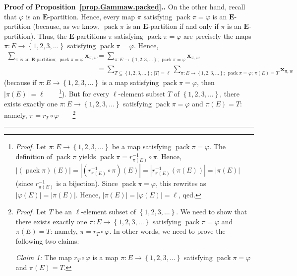 \documentclass[numbers=enddot,12pt,final,onecolumn,notitlepage,abstracton]{scrartcl}
\theoremstyle{definition}
\newenvironment{proof}[1][Proof]{\noindent\textbf{#1.} }{\ \rule{0.5em}{0.5em}}
\let\sumnonlimits\sum
\renewcommand{\sum}{\sumnonlimits\limits}
\newcommand{\xx}{{\mathbf{x}}}
\newcommand{\pack}{\operatorname{pack}}
\newcommand{\EE}{{\mathbf{E}}}
\begin{document}
\begin{proof}[Proof of Proposition~\ref{prop.Gammaw.packed}.]
On the other hand, recall that $\varphi$ is an $\EE$-partition.
Hence, every map $\pi$ satisfying $\pack \pi = \varphi$
is an $\EE$-partition (because, as we know, $\pack \pi$ is an
$\EE$-partition if and only if $\pi$ is an $\EE$-partition).
Thus, the $\EE$-partitions $\pi$ satisfying
$\pack \pi = \varphi$ are precisely the maps
$\pi : E \to \left\{1, 2, 3, \ldots\right\}$ satisfying
$\pack \pi = \varphi$. Hence,
\begin{align*}
\sum_{\pi\text{ is an }\EE\text{-partition; } \pack \pi = \varphi}
\xx_{\pi, w}
&= \sum_{\pi : E \to \left\{1, 2, 3, \ldots\right\} \text{; } \pack \pi = \varphi}
\xx_{\pi, w} \\
&= \sum_{T \subseteq \left\{1, 2, 3, \ldots\right\} ; \ \left|T\right| = \ell}
\sum_{\pi : E \to \left\{1, 2, 3, \ldots\right\} \text{; } \pack \pi = \varphi
\text{; } \pi\left(E\right) = T}
\xx_{\pi, w}
\end{align*}
(because if $\pi : E \to \left\{1, 2, 3, \ldots\right\}$ is a map
satisfying $\pack \pi = \varphi$, then
$\left|\pi\left(E\right)\right| = \ell$\ \ \ \ \footnote{\textit{Proof.}
Let $\pi : E \to \left\{1, 2, 3, \ldots\right\}$ be a map
satisfying $\pack \pi = \varphi$. The definition of $\pack \pi$
yields $\pack \pi = r_{\pi\left(E\right)}^{-1} \circ \pi$. Hence,
$\left|\left(\pack \pi\right)\left(E\right)\right|
= \left|\left(r_{\pi\left(E\right)}^{-1} \circ \pi\right)\left(E\right)\right|
= \left|r_{\pi\left(E\right)}^{-1} \left(\pi\left(E\right)\right)\right|
= \left|\pi\left(E\right)\right|$
(since $r_{\pi\left(E\right)}^{-1}$ is a bijection). Since
$\pack \pi = \varphi$, this rewrites as
$\left|\varphi\left(E\right)\right| = \left|\pi\left(E\right)\right|$.
Hence, $ \left|\pi\left(E\right)\right|
= \left|\varphi\left(E\right)\right| = \ell$, qed.}). But for every
$\ell$-element subset $T$ of
$\left\{1, 2, 3, \ldots\right\}$, there exists exactly
one $\pi : E \to \left\{1, 2, 3, \ldots\right\}$ satisfying
$\pack \pi = \varphi$ and $\pi\left(E\right) = T$: namely,
$\pi = r_T \circ \varphi$\ \ \ \ \footnote{\textit{Proof.}
Let $T$ be an $\ell$-element subset of $\left\{
1,2,3,\ldots\right\}  $. We need to show that there exists exactly one
$\pi:E\rightarrow\left\{  1,2,3,\ldots\right\}  $ satisfying
$ \pack \pi=\varphi$ and $\pi\left(  E\right)  =T$: namely,
$\pi=r_{T}\circ\varphi$. In other words, we need to prove the following two claims:

\textit{Claim 1:} The map $r_{T}\circ\varphi$ is a map $\pi:E\rightarrow
\left\{  1,2,3,\ldots\right\}  $ satisfying $ \pack \pi=\varphi$
and $\pi\left(  E\right)  =T$.

}
\end{proof}
\end{document}
